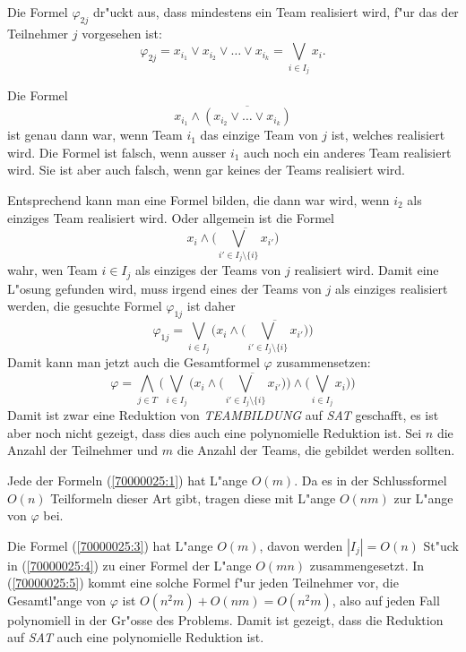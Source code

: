 \begin{loesung}
Die Formel $\varphi_{2j}$ dr"uckt aus, dass mindestens ein Team realisiert
wird, f"ur das der Teilnehmer $j$ vorgesehen ist:
\begin{equation}
\varphi_{2j}=x_{i_1}\vee x_{i_2}\vee\dots\vee x_{i_k} = \bigvee_{i\in I_j}x_i.
\label{70000025:1}
\end{equation}

Die Formel
\begin{equation}
x_{i_1}\wedge\overline{(x_{i_2}\vee\dots\vee x_{i_k})}
\label{70000025:2}
\end{equation}
ist genau dann war, wenn Team $i_1$ das einzige Team von $j$ ist,
welches realisiert wird. Die Formel ist falsch, wenn ausser $i_1$ auch
noch ein anderes Team realisiert wird. Sie ist aber auch falsch, wenn 
gar keines der Teams realisiert wird.

Entsprechend kann man eine Formel bilden, die dann war wird, wenn $i_2$ als 
einziges Team realisiert wird. Oder allgemein ist
die Formel
\begin{equation}
x_i\wedge \overline{\biggl(\bigvee_{i'\in I_j\setminus\{i\}}x_{i'}\biggr)}
\label{70000025:3}
\end{equation}
wahr, wen Team $i\in I_j$ als einziges der Teams von $j$ realisiert wird.
Damit eine L"osung gefunden wird, muss irgend eines der Teams von $j$ als
einziges realisiert werden,
die gesuchte Formel $\varphi_{1j}$ ist daher
\begin{equation}
\varphi_{1j} = 
\bigvee_{i\in I_j} \biggl(x_i\wedge
	\overline{\biggl(\bigvee_{i'\in I_j\setminus \{i\}}x_{i'}\biggr)}\biggr)
\label{70000025:4}
\end{equation}
Damit kann man jetzt auch die Gesamtformel $\varphi$ zusammensetzen:
\begin{equation}
\varphi=
\bigwedge_{j\in T}
\biggl(
\bigvee_{i\in I_j} \biggl(x_i\wedge
	\overline{\biggl(\bigvee_{i'\in I_j\setminus \{i\}}x_{i'}\biggr)}\biggr)
\wedge
\biggl(
\bigvee_{i\in I_j}x_i
\biggr)
\biggr)
\label{70000025:5}
\end{equation}
Damit ist zwar eine Reduktion von \textsl{TEAMBILDUNG} auf \textsl{SAT}
geschafft, es ist aber noch nicht gezeigt, dass dies auch eine polynomielle
Reduktion ist. Sei $n$ die Anzahl der Teilnehmer und $m$ die Anzahl der
Teams, die gebildet werden sollten.

Jede der Formeln (\ref{70000025:1}) hat L"ange $O(m)$.
Da es in der Schlussformel $O(n)$ Teilformeln dieser Art gibt, 
tragen diese mit L"ange $O(nm)$ zur L"ange von $\varphi$ bei.

Die Formel (\ref{70000025:3}) hat L"ange $O(m)$, davon werden $|I_j|=O(n)$
St"uck
in (\ref{70000025:4}) zu einer Formel der L"ange $O(mn)$ zusammengesetzt.
In (\ref{70000025:5}) kommt eine solche Formel f"ur jeden Teilnehmer vor,
die Gesamtl"ange von $\varphi$ ist $O(n^2m) + O(nm)=O(n^2m)$, also auf
jeden Fall polynomiell in der Gr"osse des Problems. Damit ist gezeigt,
dass die Reduktion auf \textsl{SAT} auch eine polynomielle Reduktion ist.
\end{loesung}

